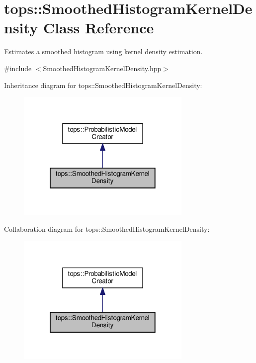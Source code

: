 \hypertarget{classtops_1_1SmoothedHistogramKernelDensity}{}\section{tops\+:\+:Smoothed\+Histogram\+Kernel\+Density Class Reference}
\label{classtops_1_1SmoothedHistogramKernelDensity}


Estimates a smoothed histogram using kernel density estimation.  




{\ttfamily \#include $<$Smoothed\+Histogram\+Kernel\+Density.\+hpp$>$}



Inheritance diagram for tops\+:\+:Smoothed\+Histogram\+Kernel\+Density\+:
\nopagebreak
\begin{figure}[H]
\begin{center}
\leavevmode
\includegraphics[width=238pt]{classtops_1_1SmoothedHistogramKernelDensity__inherit__graph}
\end{center}
\end{figure}


Collaboration diagram for tops\+:\+:Smoothed\+Histogram\+Kernel\+Density\+:
\nopagebreak
\begin{figure}[H]
\begin{center}
\leavevmode
\includegraphics[width=238pt]{classtops_1_1SmoothedHistogramKernelDensity__coll__graph}
\end{center}
\end{figure}
